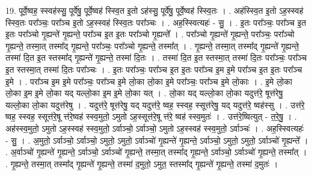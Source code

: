 \documentclass[17pt]{extarticle}
\begin{document}
19. पूर्वे॒ष्वह॒ स्स्वह॑स्सु॒ पूर्वे॑षु॒ पूर्वे॒ष्वह॑ स्स्वि॒त इ॒तो ऽह॑स्सु॒ पूर्वे॑षु॒ पूर्वे॒ष्वह॑ स्स्वि॒तः । . अह॑स्स्वि॒त इ॒तो ऽह॒स्स्वह॑ स्स्वि॒तः परा᳚ञ्चः॒ परा᳚ञ्च इ॒तो ऽह॒स्स्वह॑ स्स्वि॒तः परा᳚ञ्चः । . अह॒स्स्वित्यहः॑ - सु॒ । . इ॒तः परा᳚ञ्चः॒ परा᳚ञ्च इ॒त इ॒तः परा᳚ञ्चो गृ॒ह्यन्ते॑ गृ॒ह्यन्ते॒ परा᳚ञ्च इ॒त इ॒तः परा᳚ञ्चो गृ॒ह्यन्ते᳚ । . परा᳚ञ्चो गृ॒ह्यन्ते॑ गृ॒ह्यन्ते॒ परा᳚ञ्चः॒ परा᳚ञ्चो गृ॒ह्यन्ते॒ तस्मा॒त् तस्मा᳚द् गृ॒ह्यन्ते॒ परा᳚ञ्चः॒ परा᳚ञ्चो गृ॒ह्यन्ते॒ तस्मा᳚त् । . गृ॒ह्यन्ते॒ तस्मा॒त् तस्मा᳚द् गृ॒ह्यन्ते॑ गृ॒ह्यन्ते॒ तस्मा॑ दि॒त इ॒त स्तस्मा᳚द् गृ॒ह्यन्ते॑ गृ॒ह्यन्ते॒ तस्मा॑ दि॒तः । . तस्मा॑ दि॒त इ॒त स्तस्मा॒त् तस्मा॑ दि॒तः परा᳚ञ्चः॒ परा᳚ञ्च इ॒त स्तस्मा॒त् तस्मा॑ दि॒तः परा᳚ञ्चः । . इ॒तः परा᳚ञ्चः॒ परा᳚ञ्च इ॒त इ॒तः परा᳚ञ्च इ॒म इ॒मे परा᳚ञ्च इ॒त इ॒तः परा᳚ञ्च इ॒मे । . परा᳚ञ्च इ॒म इ॒मे परा᳚ञ्चः॒ परा᳚ञ्च इ॒मे लो॒का लो॒का इ॒मे परा᳚ञ्चः॒ परा᳚ञ्च इ॒मे लो॒काः । . इ॒मे लो॒का लो॒का इ॒म इ॒मे लो॒का यद् यल्लो॒का इ॒म इ॒मे लो॒का यत् । . लो॒का यद् यल्लो॒का लो॒का यदुत्त॑रे॒ षूत्त॑रेषु॒ यल्लो॒का लो॒का यदुत्त॑रेषु । . यदुत्त॑रे॒ षूत्त॑रेषु॒ यद् यदुत्त॑रे॒ ष्वह॒ स्स्वह॒ स्सूत्त॑रेषु॒ यद् यदुत्त॑रे॒ ष्वह॑स्सु । . उत्त॑रे॒ ष्वह॒ स्स्वह॒ स्सूत्त॑रे॒षू त्त॑रे॒ष्वह॑ स्स्व॒मुतो॒ ऽमुतो ऽह॒स्सूत्त॑रे॒षू त्त॑रे॒ ष्वह॑ स्स्व॒मुतः॑ । . उत्त॑रे॒ष्वित्युत् - त॒रे॒षु॒ । . अह॑स्स्व॒मुतो॒ ऽमुतो ऽह॒स्स्वह॑ स्स्व॒मुतो॒ ऽर्वाञ्चो॒ ऽर्वाञ्चो॒ ऽमुतो ऽह॒स्स्वह॑ स्स्व॒मुतो॒ ऽर्वाञ्चः॑ । . अह॒स्स्वित्यहः॑ - सु॒ । . अ॒मुतो॒ ऽर्वाञ्चो॒ ऽर्वाञ्चो॒ ऽमुतो॒ ऽमुतो॒ ऽर्वाञ्चो॑ गृ॒ह्यन्ते॑ गृ॒ह्यन्ते॒ ऽर्वाञ्चो॒ ऽमुतो॒ ऽमुतो॒ ऽर्वाञ्चो॑ गृ॒ह्यन्ते᳚ । . अ॒र्वाञ्चो॑ गृ॒ह्यन्ते॑ गृ॒ह्यन्ते॒ ऽर्वाञ्चो॒ ऽर्वाञ्चो॑ गृ॒ह्यन्ते॒ तस्मा॒त् तस्मा᳚द् गृ॒ह्यन्ते॒ ऽर्वाञ्चो॒ ऽर्वाञ्चो॑ गृ॒ह्यन्ते॒ तस्मा᳚त् । . गृ॒ह्यन्ते॒ तस्मा॒त् तस्मा᳚द् गृ॒ह्यन्ते॑ गृ॒ह्यन्ते॒ तस्मा॑ द॒मुतो॒ ऽमुत॒ स्तस्मा᳚द् गृ॒ह्यन्ते॑ गृ॒ह्यन्ते॒ तस्मा॑ द॒मुतः॑ । \newline
\end{document}
